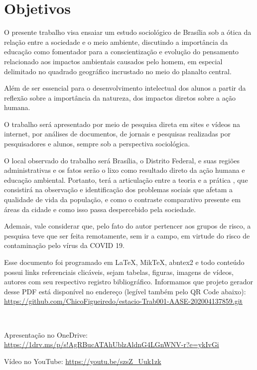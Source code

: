 \chapter{Objetivos}

O presente trabalho visa ensaiar um estudo sociológico de Brasília sob a ótica da relação entre a sociedade e o meio ambiente, discutindo a importância da educação como fomentador para a conscientização e evolução do pensamento relacionado aos impactos ambientais causados pelo homem, em especial delimitado no quadrado geográfico incrustado no meio do planalto central.

Além de ser essencial para o desenvolvimento intelectual dos alunos a partir da reflexão sobre a importância da natureza, dos impactos diretos sobre a ação humana.

O trabalho será apresentado por meio de pesquisa direta em sites e vídeos na internet, por análises de documentos, de jornais e pesquisas realizadas por pesquisadores e alunos, sempre sob a perspectiva sociológica.

O local observado do trabalho será Brasília, o Distrito Federal, e suas regiões administrativas e os fatos serão o lixo como resultado direto da ação humana e educação ambiental. Portanto, terá a articulação entre a teoria e a prática , que consistirá na observação e identificação dos problemas sociais que afetam a qualidade de vida da população, e como o contraste comparativo presente em áreas da cidade e como isso passa despercebido pela sociedade.

Ademais, vale considerar que, pelo fato do autor pertencer aos grupos de risco, a pesquisa teve que ser feita remotamente, sem ir a campo, em virtude do risco de contaminação pelo vírus da COVID 19.


Esse documento foi programado em \LaTeX, MikTeX, abntex2 e todo conteúdo possui links referenciais clicáveis, sejam tabelas, figuras, imagens de vídeos, autores com seu respectivo registro bibliográfico.
Informamos que projeto gerador desse PDF está disponível no endereço (legível também pelo QR Code abaixo): \\
\url{https://github.com/ChicoFigueiredo/estacio-Trab001-AASE-202004137859.git} \\
\begin{center}
         \\
\end{center}


Apresentação no OneDrive: \url{https://1drv.ms/p/s!AgRBucATAhUblzAldnG4LGnWNV-r?e=ykIvGi} \\
\begin{center}
\end{center}




Vídeo no YouTube: \url{https://youtu.be/szsZ_Uuk1zk} \\
\begin{center}
\end{center}
